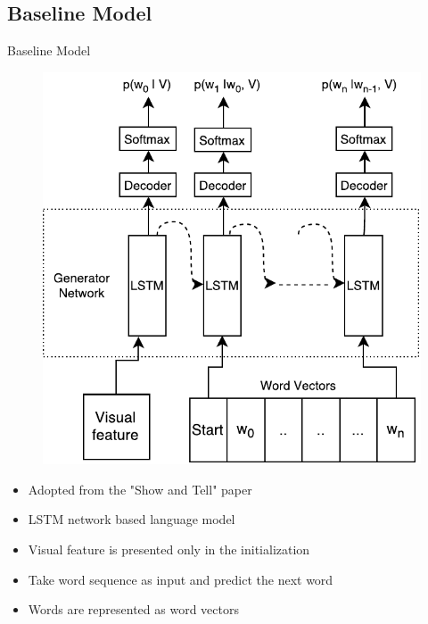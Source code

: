 \documentclass{beamer}
\begin{document}
\subsection{Baseline Model}
\begin{frame}{Baseline Model}
    \begin{figure}[h]
        \centering
        \includegraphics[width=0.4\linewidth]{images/Thesis_lstmLangGen.pdf}
    \end{figure}
    \begin{itemize}
        \item Adopted from the "Show and Tell" paper~\cite{Vinyals_2015_CVPR} 
        \item LSTM network based language model
        \item Visual feature is presented only in the initialization 
        \item Take word sequence as input and predict the next word
        \item Words are represented as word vectors 
    \end{itemize}
\end{frame}
\end{document}
